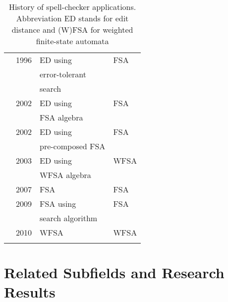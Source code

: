 \documentclass[officiallayout,final]{unihelcompling}
\begin{document}
\begin{longtable}{|l|r|l|l|}
        \hline
      \citep{oflazer1996errortolerant} & 1996 & ED using & FSA \\
                                       &      & error-tolerant & \\
                                       &      & search & \\
\citep{agata2002typographical} & 2002 & ED using & FSA \\
                               &      & FSA algebra &  \\
      \citep{schulz2002fast} & 2002 & ED using         & FSA  \\
                             &      & pre-composed FSA & \\
        \citep{mohri2003edit} & 2003 & ED using & WFSA \\
                              &      & WFSA algebra &  \\
    \citep{otero2007contextual} & 2007 & FSA & FSA  \\
      \citep{hulden2009fast} & 2009 & FSA using & FSA \\
                                &   & search algorithm & \\
\citep{pirinen2010finitestate} & 2010 & WFSA & WFSA \\
        \hline
    \caption{History of spell-checker applications. Abbreviation ED stands for
    edit distance and (W)FSA for weighted finite-state automata
    \label{table:history-apps}}
\end{longtable}

\section{Related Subfields and Research Results}
\label{sec:related}
\end{document}
